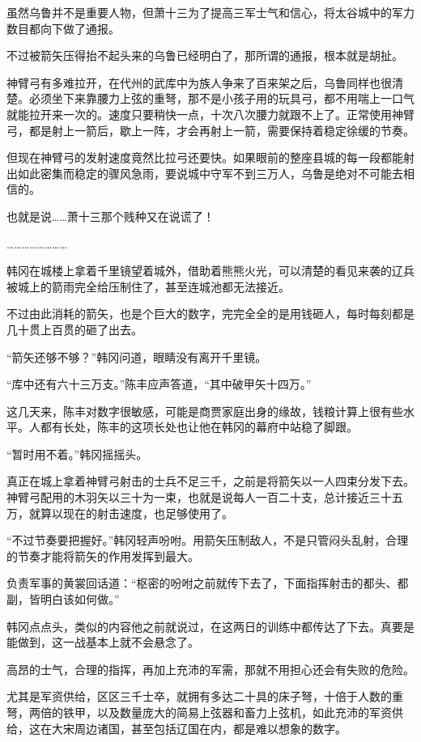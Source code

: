 虽然乌鲁并不是重要人物，但萧十三为了提高三军士气和信心，将太谷城中的军力数目都向下做了通报。

不过被箭矢压得抬不起头来的乌鲁已经明白了，那所谓的通报，根本就是胡扯。

神臂弓有多难拉开，在代州的武库中为族人争来了百来架之后，乌鲁同样也很清楚。必须坐下来靠腰力上弦的重弩，那不是小孩子用的玩具弓，都不用喘上一口气就能拉开来一次的。速度只要稍快一点，十次八次腰力就跟不上了。正常使用神臂弓，都是射上一箭后，歇上一阵，才会再射上一箭，需要保持着稳定徐缓的节奏。

但现在神臂弓的发射速度竟然比拉弓还要快。如果眼前的整座县城的每一段都能射出如此密集而稳定的骤风急雨，要说城中守军不到三万人，乌鲁是绝对不可能去相信的。

也就是说……萧十三那个贱种又在说谎了！

……………………

韩冈在城楼上拿着千里镜望着城外，借助着熊熊火光，可以清楚的看见来袭的辽兵被城上的箭雨完全给压制住了，甚至连城池都无法接近。

不过由此消耗的箭矢，也是个巨大的数字，完完全全的是用钱砸人，每时每刻都是几十贯上百贯的砸了出去。

“箭矢还够不够？”韩冈问道，眼睛没有离开千里镜。

“库中还有六十三万支。”陈丰应声答道，“其中破甲矢十四万。”

这几天来，陈丰对数字很敏感，可能是商贾家庭出身的缘故，钱粮计算上很有些水平。人都有长处，陈丰的这项长处也让他在韩冈的幕府中站稳了脚跟。

“暂时用不着。”韩冈摇摇头。

真正在城上拿着神臂弓射击的士兵不足三千，之前是将箭矢以一人四束分发下去。神臂弓配用的木羽矢以三十为一束，也就是说每人一百二十支，总计接近三十五万，就算以现在的射击速度，也足够使用了。

“不过节奏要把握好。”韩冈轻声吩咐。用箭矢压制敌人，不是只管闷头乱射，合理的节奏才能将箭矢的作用发挥到最大。

负责军事的黄裳回话道：“枢密的吩咐之前就传下去了，下面指挥射击的都头、都副，皆明白该如何做。”

韩冈点点头，类似的内容他之前就说过，在这两日的训练中都传达了下去。真要是能做到，这一战基本上就不会悬念了。

高昂的士气，合理的指挥，再加上充沛的军需，那就不用担心还会有失败的危险。

尤其是军资供给，区区三千士卒，就拥有多达二十具的床子弩，十倍于人数的重弩，两倍的铁甲，以及数量庞大的简易上弦器和畜力上弦机，如此充沛的军资供给，这在大宋周边诸国，甚至包括辽国在内，都是难以想象的数字。

